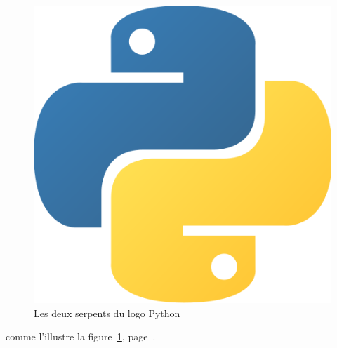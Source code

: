 \begin{figure}[here] %
    \includegraphics[height=0.2\textheight]{img/Python}
    \caption{Les deux serpents du logo Python} %
    \label{py} %
\end{figure} %
comme l'illustre la figure~\ref{py}, page~\pageref{py}.
